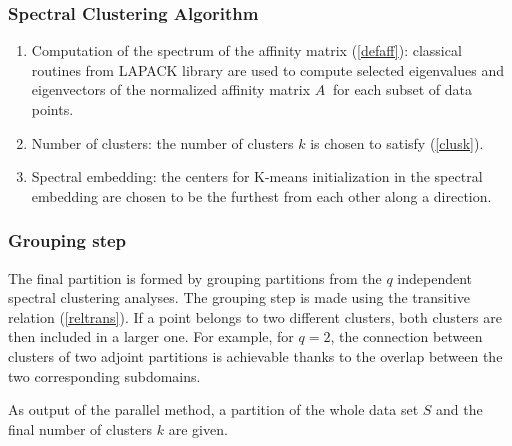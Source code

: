 \documentclass[runningheads,a4paper]{llncs}
\begin{document}
\subsubsection{Spectral Clustering Algorithm}

\begin{enumerate}
  \item {Computation of the spectrum of the affinity matrix (\ref{defaff}):}
        classical routines from LAPACK library \cite{anderson1999lapack} are used to
        compute selected eigenvalues and  eigenvectors of the normalized  affinity
        matrix $A~$ for each subset of data points.
  \item {Number of clusters:}
        the number of clusters $k$ is chosen to satisfy (\ref{clusk}).
  \item {Spectral embedding:}
        the centers for K-means initialization in the spectral embedding are
        chosen to be the furthest from each other along a direction.
\end{enumerate}

\subsubsection{Grouping step} 

The final partition is formed by grouping partitions from the $q$ independent
spectral clustering analyses. The grouping step is made using the transitive
relation (\ref{reltrans}). If a point belongs to two different clusters, both
clusters are then included in a larger one.  For example, for $q=2$, the
connection between clusters of two adjoint partitions is achievable thanks to
the overlap between the two corresponding subdomains.

As output of the parallel method, a partition of the whole data set $S$ and
the final number of clusters $k$ are given.
\end{document}
